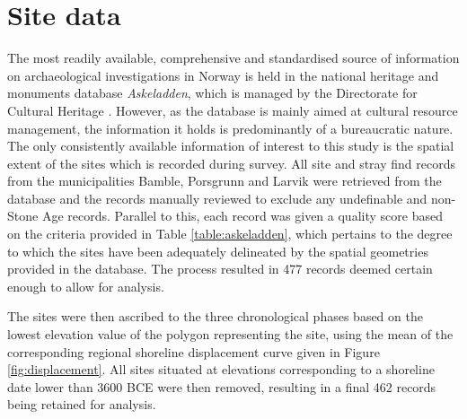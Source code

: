 \documentclass[12pt, a4paper]{article}
\begin{document}
\section{Site data}
The most readily available, comprehensive and standardised source of information on archaeological investigations in Norway is held in the national heritage and monuments database \textit{Askeladden}, which is managed by the Directorate for Cultural Heritage \citep{askeladden2018}. However, as the database is mainly aimed at cultural resource management, the information it holds is predominantly of a bureaucratic nature. The only consistently available information of interest to this study is the spatial extent of the sites which is recorded during survey. All site and stray find records from the municipalities Bamble, Porsgrunn and Larvik were retrieved from the database and the records manually reviewed to exclude any undefinable and non-Stone Age records. Parallel to this, each record was given a quality score based on the criteria provided in Table \ref{table:askeladden}, which pertains to the degree to which the sites have been adequately delineated by the spatial geometries provided in the database. The process resulted in 477 records deemed certain enough to allow for analysis.\par
The sites were then ascribed to the three chronological phases based on the lowest elevation value of the polygon representing the site, using the mean of the corresponding regional shoreline displacement curve given in Figure \ref{fig:displacement}. All sites situated at elevations corresponding to a shoreline date lower than 3600 BCE were then removed, resulting in a final 462 records being retained for analysis. \par  
\end{document}
